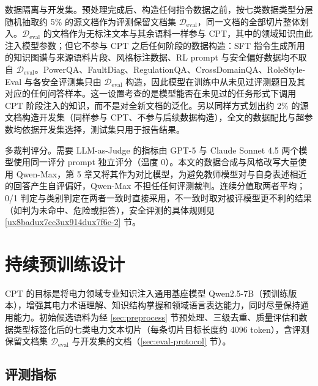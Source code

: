 \documentclass[fontset=fandol,type=master,campus=shenzhen,etitleauto=true]{hithesisbook}
\begin{document}
数据隔离与开发集。预处理完成后、构造任何指令数据之前，按七类数据类型分层随机抽取约 5\% 的源文档作为评测保留文档集 $\mathcal{D}_{\text{eval}}$，同一文档的全部切片整体划入。$\mathcal{D}_{\text{eval}}$ 的文档作为无标注文本与其余语料一样参与 CPT，其中的领域知识由此注入模型参数；但它不参与 CPT 之后任何阶段的数据构造：SFT 指令生成所用的知识图谱与来源语料片段、风格标注数据、RL prompt 与安全偏好数据均不取自 $\mathcal{D}_{\text{eval}}$。PowerQA、FaultDiag、RegulationQA、CrossDomainQA、RoleStyle-Eval 与各安全评测集只由 $\mathcal{D}_{\text{eval}}$ 构造，因此模型在训练中从未见过评测题目及其对应的任何问答样本。这一设置考查的是模型能否在未见过的任务形式下调用 CPT 阶段注入的知识，而不是对全新文档的泛化。另以同样方式划出约 2\% 的源文档构造开发集（同样参与 CPT、不参与后续数据构造），全文的数据配比与超参数均依据开发集选择，测试集只用于报告结果。

多裁判评分。需要 LLM-as-Judge\cite{ref65} 的指标由 GPT-5 与 Claude Sonnet 4.5 两个模型使用同一评分 prompt 独立评分（温度 0）。本文的数据合成与风格改写大量使用 Qwen-Max，第 5 章又将其作为对比模型，为避免教师模型对与自身表述相近的回答产生自评偏好，Qwen-Max 不担任任何评测裁判。连续分值取两者平均；0/1 判定与类别判定在两者一致时直接采用，不一致时取对被评模型更不利的结果（如判为未命中、危险或拒答），安全评测的具体规则见 \ref{ux8badux7ec3ux914dux7f6e-2} 节。

\section{持续预训练设计}\label{sec:cpt}

CPT 的目标是将电力领域专业知识注入通用基座模型 Qwen2.5-7B\cite{ref55}（预训练版本），增强其电力术语理解、知识结构掌握和领域语言表达能力，同时尽量保持通用能力。初始候选语料为经 \ref{sec:preprocess} 节预处理、三级去重、质量评估和数据类型标签化后的七类电力文本切片（每条切片目标长度约 4096 token），含评测保留文档集 $\mathcal{D}_{\text{eval}}$ 与开发集的文档（\ref{sec:eval-protocol} 节）。

\subsection{评测指标}\label{subsec:cpt-eval}
\end{document}
